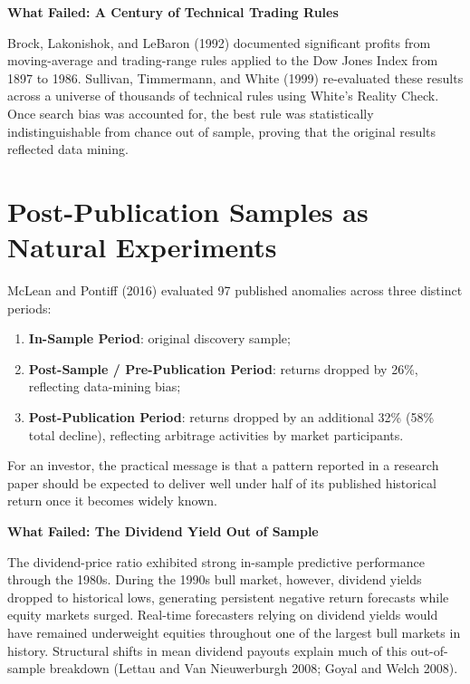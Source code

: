 \begin{callout}
\noindent \textbf{What Failed: A Century of Technical Trading Rules}

Brock, Lakonishok, and LeBaron (1992) documented significant profits from moving-average and trading-range rules applied to the Dow Jones Index from 1897 to 1986. Sullivan, Timmermann, and White (1999) re-evaluated these results across a universe of thousands of technical rules using White's Reality Check. Once search bias was accounted for, the best rule was statistically indistinguishable from chance out of sample, proving that the original results reflected data mining.
\end{callout}

\section{Post-Publication Samples as Natural Experiments}
\label{sec:09-postpub}

McLean and Pontiff (2016) evaluated 97 published anomalies across three distinct periods:
\begin{enumerate}
  \item \textbf{In-Sample Period}: original discovery sample;
  \item \textbf{Post-Sample / Pre-Publication Period}: returns dropped by 26\%, reflecting data-mining bias;
  \item \textbf{Post-Publication Period}: returns dropped by an additional 32\% (58\% total decline), reflecting arbitrage activities by market participants.
\end{enumerate}
For an investor, the practical message is that a pattern reported in a research paper should be expected to deliver well under half of its published historical return once it becomes widely known.

\begin{callout}
\noindent \textbf{What Failed: The Dividend Yield Out of Sample}

The dividend-price ratio exhibited strong in-sample predictive performance through the 1980s. During the 1990s bull market, however, dividend yields dropped to historical lows, generating persistent negative return forecasts while equity markets surged. Real-time forecasters relying on dividend yields would have remained underweight equities throughout one of the largest bull markets in history. Structural shifts in mean dividend payouts explain much of this out-of-sample breakdown (Lettau and Van Nieuwerburgh 2008; Goyal and Welch 2008).
\end{callout}


